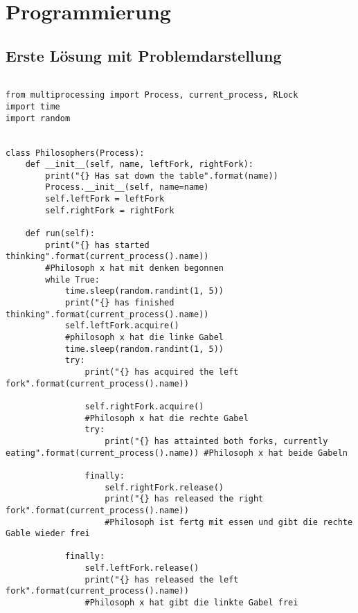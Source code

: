 \chapter{Programmierung}
\label{programmierung}

\section{Erste Lösung mit Problemdarstellung}
\label{erste_lösung}


\begin{lstlisting}[style = Python, label = {erste Lösung}, caption = {erste "naive" Lösung}]

from multiprocessing import Process, current_process, RLock
import time
import random


class Philosophers(Process):
    def __init__(self, name, leftFork, rightFork):
        print("{} Has sat down the table".format(name))
        Process.__init__(self, name=name)
        self.leftFork = leftFork
        self.rightFork = rightFork

    def run(self):
        print("{} has started thinking".format(current_process().name)) 
        #Philosoph x hat mit denken begonnen
        while True:
            time.sleep(random.randint(1, 5))
            print("{} has finished thinking".format(current_process().name))
            self.leftFork.acquire() 
            #philosoph x hat die linke Gabel
            time.sleep(random.randint(1, 5))
            try:
                print("{} has acquired the left fork".format(current_process().name))

                self.rightFork.acquire() 
                #Philosoph x hat die rechte Gabel
                try:
                    print("{} has attainted both forks, currently eating".format(current_process().name)) #Philosoph x hat beide Gabeln

                finally:
                    self.rightFork.release()
                    print("{} has released the right fork".format(current_process().name)) 
                    #Philosoph ist fertg mit essen und gibt die rechte Gable wieder frei

            finally:
                self.leftFork.release()
                print("{} has released the left fork".format(current_process().name)) 
                #Philosoph x hat gibt die linkte Gabel frei

\end{lstlisting}

